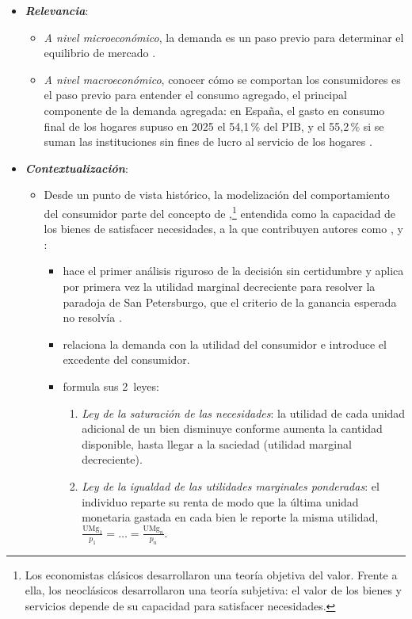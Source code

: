 \documentclass[11pt]{article}
\begin{document}
\begin{itemize}
\item \textbf{\emph{Relevancia}}:
  \begin{itemize}
  \item \emph{A nivel microeconómico}, la demanda es un paso previo para determinar el equilibrio de mercado .
  \item \emph{A nivel macroeconómico}, conocer cómo se comportan los consumidores es el paso previo para entender el consumo agregado, el principal componente de la demanda agregada: en España, el gasto en consumo final de los hogares supuso en 2025 el 54,1\,\% del PIB, y el 55,2\,\% si se suman las instituciones sin fines de lucro al servicio de los hogares \parencite{Eurostat2026Nama10gdp,INE2026CNTRDemanda}.
  \end{itemize}

\item \textbf{\emph{Contextualización}}:
  \begin{itemize}
  \item Desde un punto de vista histórico, la modelización del comportamiento del consumidor parte del concepto de ,\footnote{Los economistas clásicos desarrollaron una teoría objetiva del valor. Frente a ella, los neoclásicos desarrollaron una teoría subjetiva: el valor de los bienes y servicios depende de su capacidad para satisfacer necesidades.} entendida como la capacidad de los bienes de satisfacer necesidades, a la que contribuyen autores como ,  y :
    \begin{itemize}
    \item \textcite{Bernoulli1738Specimen} hace el primer análisis riguroso de la decisión sin certidumbre y aplica por primera vez la utilidad marginal decreciente para resolver la paradoja de San Petersburgo, que el criterio de la ganancia esperada no resolvía .
    \item \textcite{Dupuit1844Mesure} relaciona la demanda con la utilidad del consumidor e introduce el excedente del consumidor.
    \item \textcite{Gossen1854Entwickelung} formula sus 2~leyes:
      \begin{enumerate}
      \item \emph{Ley de la saturación de las necesidades}: la utilidad de cada unidad adicional de un bien disminuye conforme aumenta la cantidad disponible, hasta llegar a la saciedad (utilidad marginal decreciente).
      \item \emph{Ley de la igualdad de las utilidades marginales ponderadas}:\label{ley:gossen2} el individuo reparte su renta de modo que la última unidad monetaria gastada en cada bien le reporte la misma utilidad, $\frac{\mathrm{UMg}_1}{p_1}=\dots=\frac{\mathrm{UMg}_n}{p_n}$.

\end{enumerate}
\end{itemize}
\end{itemize}
\end{itemize}
\end{document}
